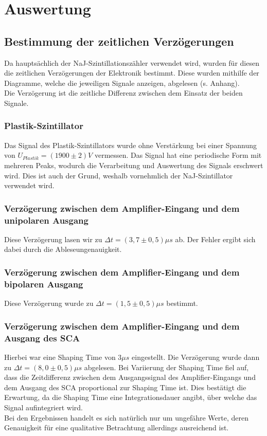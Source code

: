 \clearpage
\section{Auswertung}
\subsection{Bestimmung der zeitlichen Verzögerungen}
Da hauptsächlich der NaJ-Szintillationszähler verwendet wird, wurden für diesen die zeitlichen Verzögerungen der Elektronik bestimmt. Diese wurden mithilfe der Diagramme, welche die jeweiligen Signale anzeigen, abgelesen (s. Anhang). \\
Die Verzögerung ist die zeitliche Differenz zwischen dem Einsatz der beiden Signale.\\
\subsubsection{Plastik-Szintillator}
Das Signal des Plastik-Szintillators wurde ohne Verstärkung bei einer Spannung von $U_{Plastik}=(1900\pm2)V$ vermessen. Das Signal hat eine periodische Form mit mehreren Peaks, wodurch die Verarbeitung und Auswertung des Signals erschwert wird. Dies ist auch der Grund, weshalb vornehmlich der NaJ-Szintillator verwendet wird.
\subsubsection{Verzögerung zwischen dem Amplifier-Eingang und dem unipolaren Ausgang}
Diese Verzögerung lasen wir zu $\Delta t=(3,7\pm0,5)\mu s$ ab. Der Fehler ergibt sich dabei durch die Ableseungenauigkeit.
\subsubsection{Verzögerung zwischen dem Amplifier-Eingang und dem bipolaren Ausgang}
Diese Verzögerung wurde zu $\Delta t=(1,5\pm0,5)\mu s$ bestimmt.
\subsubsection{Verzögerung zwischen dem Amplifier-Eingang und dem Ausgang des SCA}
Hierbei war eine Shaping Time von $3 \mu s$ eingestellt. Die Verzögerung wurde dann zu $\Delta t=(8,0\pm0,5)\mu s$ abgelesen. Bei Variierung der Shaping Time fiel auf, dass die Zeitdifferenz zwischen dem Ausgangssignal des Amplifier-Eingangs und dem Ausgang des SCA proportional zur Shaping Time ist. Dies bestätigt die Erwartung, da die Shaping Time eine Integrationsdauer angibt, über welche das Signal aufintegriert wird. \\
Bei den Ergebnissen handelt es sich natürlich nur um ungefähre Werte, deren Genauigkeit für eine qualitative Betrachtung allerdings ausreichend ist.
\clearpage
